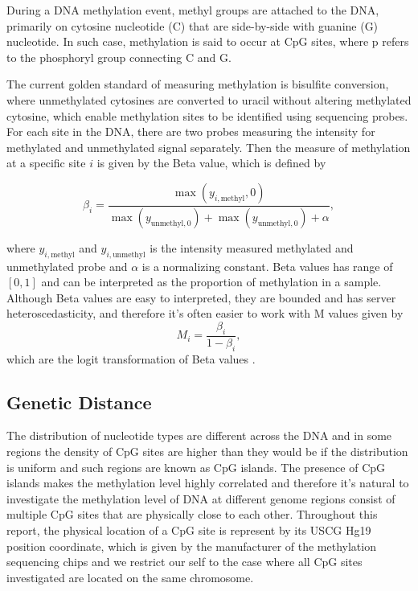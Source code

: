 \documentclass{report}
\begin{document}
\par
 During a DNA methylation event, methyl groups are attached to the DNA, primarily on cytosine nucleotide (C) that are side-by-side with guanine (G) nucleotide. 
In such case, methylation is said to occur at CpG sites, where p refers to the phosphoryl group connecting C and G\cite{griffiths2005introduction}.

\par
 The current golden standard of measuring methylation is bisulfite conversion, where unmethylated cytosines are converted to uracil without altering methylated cytosine, 
which enable methylation sites to be identified using sequencing probes\cite{fazzari2010introduction}. For each site in the DNA, there are two probes measuring the intensity for methylated and unmethylated signal separately. Then the measure of methylation at a specific site $i$ is given by the Beta value, which is defined by

\[ 
\beta_i = \frac{\max(y_{i,\text{methyl}},0 )}{\max(y_{\text{unmethyl},0}) + \max(y_{\text{unmethyl},0}) + \alpha },
\]

where $y_{i,\text{methyl}}$ and $y_{i, \text{unmethyl}}$ is the intensity measured methylated and unmethylated probe and $\alpha$ is a normalizing constant. Beta values has range of $[0,1]$ and can be
interpreted as the proportion of methylation in a sample. Although Beta values are easy to interpreted, they are bounded and has server heteroscedasticity, and therefore it's often easier to work with M values given
by
\[ 
    M_i = \frac{\beta_i}{1-\beta_i},
\]
which are the logit transformation of Beta values \cite{du2010comparison}.




\subsection{Genetic Distance} 
\par
The distribution of nucleotide types are different across the DNA and in some regions the density of CpG sites are higher than they would be if the distribution is uniform and such regions are known as CpG islands. 
The presence of CpG islands makes the  methylation level highly correlated and therefore it's natural to investigate the methylation level 
of DNA at different genome regions consist of multiple CpG sites that are physically close to each other. Throughout this report, the physical location of a CpG site 
is represent by its USCG Hg19 position coordinate, which is given by the manufacturer of the methylation sequencing chips \cite{Infinium} and we restrict our self to the case where all CpG sites investigated are located  on the same chromosome.
\end{document}
